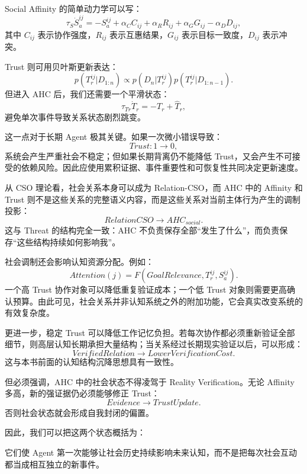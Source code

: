 Social Affinity 的简单动力学可以写：
\[
\tau_S
\dot S_a^{ij}
=
-S_a^{ij}
+
\alpha_C C_{ij}
+
\alpha_R R_{ij}
+
\alpha_G G_{ij}
-
\alpha_D D_{ij},
\]
其中 \(C_{ij}\) 表示协作强度，\(R_{ij}\) 表示互惠结果，\(G_{ij}\) 表示目标一致度，\(D_{ij}\) 表示冲突。

Trust 则可用贝叶斯更新表达：
\[
p(T_r^{ij}|D_{1:n})
\propto
p(D_n|T_r^{ij})
p(T_r^{ij}|D_{1:n-1}).
\]
但进入 AHC 后，我们还需要一个平滑状态：
\[
\tau_{Tr}\dot T_r
=
-T_r+\hat T_r,
\]
避免单次事件导致关系状态剧烈跳变。

这一点对于长期 Agent 极其关键。如果一次微小错误导致：
\[
Trust:1\rightarrow0,
\]
系统会产生严重社会不稳定；但如果长期背离仍不能降低 Trust，又会产生不可接受的依赖风险。因此应使用累积证据、事件重要性和可恢复性共同决定更新速度。

从 CSO 理论看，社会关系本身可以成为 Relation-CSO，而 AHC 中的 Affinity 和 Trust 则不是这些关系的完整语义内容，而是这些关系对当前主体行为产生的调制投影：
\[
RelationCSO
\rightarrow
AHC_{social}.
\]
这与 Threat 的结构完全一致：AHC 不负责保存全部“发生了什么”，而负责保存“这些结构持续如何影响我”。

社会调制还会影响认知资源分配。例如：
\[
Attention(j)
=
F(
GoalRelevance,
T_r^{ij},
S_a^{ij}
).
\]
一个高 Trust 协作对象可以降低重复验证成本；一个低 Trust 对象则需要更高确认预算。由此可见，社会关系并非认知系统之外的附加功能，它会真实改变系统的有效复杂度。

更进一步，稳定 Trust 可以降低工作记忆负担。若每次协作都必须重新验证全部细节，则高层认知长期承担大量结构；当关系经过长期现实验证以后，可以形成：
\[
VerifiedRelation
\rightarrow
LowerVerificationCost.
\]
这与本书前面的认知结构沉降思想具有一致性。

但必须强调，AHC 中的社会状态不得凌驾于 Reality Verification。无论 Affinity 多高，新的强证据仍必须能够修正 Trust：
\[
Evidence
\rightarrow
TrustUpdate.
\]
否则社会状态就会形成自我封闭的偏置。

因此，我们可以把这两个状态概括为：
\begin{statementbox}
\centering
{}
\end{statementbox}
\begin{statementbox}
\centering
{}
\end{statementbox}
它们使 Agent 第一次能够让社会历史持续影响未来认知，而不是把每次社会互动都当成相互独立的新事件。

